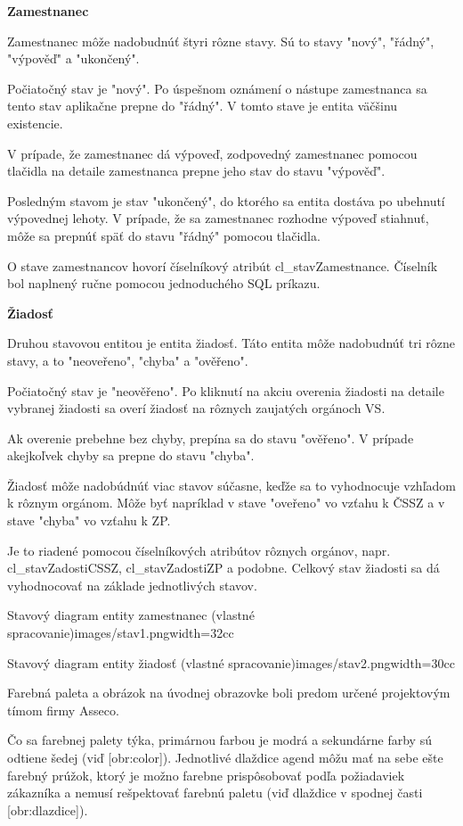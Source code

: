 \blank
\start\bf Zamestnanec \stop

Zamestnanec môže nadobudnúť štyri rôzne stavy. Sú to stavy "nový", "řádný", "výpověď" a "ukončený".

Počiatočný stav je "nový". Po úspešnom oznámení o nástupe zamestnanca sa tento stav aplikačne prepne do "řádný". V tomto stave je entita väčšinu existencie. 

V prípade, že zamestnanec dá výpoveď, zodpovedný zamestnanec pomocou tlačidla na detaile zamestnanca prepne jeho stav do stavu "výpověď". 

Posledným stavom je stav "ukončený", do ktorého sa entita dostáva po ubehnutí výpovednej lehoty. V prípade, že sa zamestnanec rozhodne výpoveď stiahnuť, môže sa prepnúť späť do stavu "řádný" pomocou tlačidla. 

O stave zamestnancov hovorí číselníkový atribút cl_stavZamestnance. Číselník bol naplnený ručne pomocou jednoduchého SQL príkazu.

\blank
\start\bf Žiadosť \stop

Druhou stavovou entitou je entita žiadosť. Táto entita môže nadobudnúť tri rôzne stavy, a to "neoveřeno", "chyba" a "ověřeno". 

Počiatočný stav je "neověřeno". Po kliknutí na akciu overenia žiadosti na detaile vybranej žiadosti sa overí žiadosť na rôznych zaujatých orgánoch VS. 

Ak overenie prebehne bez chyby, prepína sa do stavu "ověřeno". V prípade akejkoľvek chyby sa prepne do stavu "chyba". 

Žiadosť môže nadobúdnúť viac stavov súčasne, keďže sa to vyhodnocuje vzhľadom k rôznym orgánom. Môže byť napríklad v stave "oveřeno" vo vzťahu k ČSSZ a v stave "chyba" vo vzťahu k ZP. 

Je to riadené pomocou číselníkových atribútov rôznych orgánov, napr. cl_stavZadostiCSSZ, cl_stavZadostiZP a podobne. Celkový stav žiadosti sa dá vyhodnocovať na základe jednotlivých stavov. 


{Stavový diagram entity zamestnanec (vlastné spracovanie)}{images/stav1.png}{width=32cc} 


{Stavový diagram entity žiadosť (vlastné spracovanie)}{images/stav2.png}{width=30cc} 

Farebná paleta a obrázok na úvodnej obrazovke boli predom určené projektovým tímom firmy Asseco.

Čo sa farebnej palety týka, primárnou farbou je modrá a sekundárne farby sú odtiene šedej (viď [obr:color]). Jednotlivé dlaždice agend môžu mať na sebe ešte farebný prúžok, ktorý je možno farebne prispôsobovať podľa požiadaviek zákazníka a nemusí rešpektovať farebnú paletu (viď dlaždice v spodnej časti [obr:dlazdice]).

